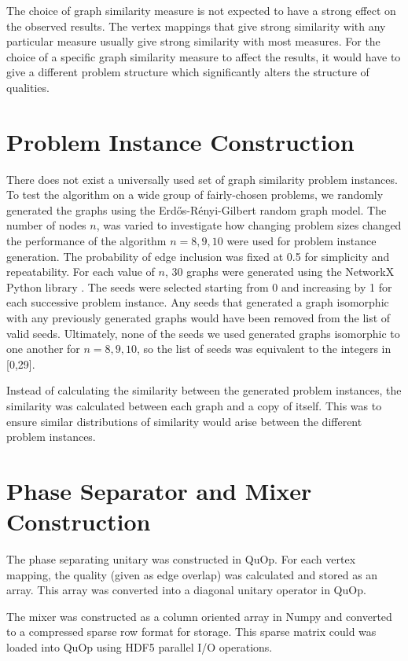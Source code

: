 The choice of graph similarity measure is not expected to have a strong effect on the observed results. The vertex mappings that give strong similarity with any particular measure usually give strong similarity with most measures. For the choice of a specific graph similarity measure to affect the results, it would have to give a different problem structure which significantly alters the structure of qualities.

\section{Problem Instance Construction}
There does not exist a universally used set of graph similarity problem instances. To test the algorithm on a wide group of fairly-chosen problems, we randomly generated the graphs using the Erdős-Rényi-Gilbert random graph model\cite{erdos_renyi,gilbert}.
The number of nodes $n$, was varied to investigate how changing problem sizes changed the performance of the algorithm $n=8,9,10$ were used for problem instance generation. The probability of edge inclusion was fixed at 0.5 for simplicity and repeatability. For each value of $n$, 30 graphs were generated using the NetworkX Python library \cite{networkx}. The seeds were selected starting from 0 and increasing by 1 for each successive problem instance. Any seeds that generated a graph isomorphic with any previously generated graphs would have been removed from the list of valid seeds. Ultimately, none of the seeds we used generated graphs isomorphic to one another for $n=8,9,10$, so the list of seeds was equivalent to the integers in [0,29].

Instead of calculating the similarity between the generated problem instances, the similarity was calculated between each graph and a copy of itself. This was to ensure similar distributions of similarity would arise between the different problem instances.

\section{Phase Separator and Mixer Construction}
The phase separating unitary was constructed in QuOp. For each vertex mapping, the quality (given as edge overlap) was calculated and stored as an array. This array was converted into a diagonal unitary operator in QuOp.

The mixer was constructed as a column oriented array in Numpy \cite{numpy} and converted to a compressed sparse row format for storage. This sparse matrix could was loaded into QuOp using HDF5 parallel I/O operations\cite{hdf5}.


